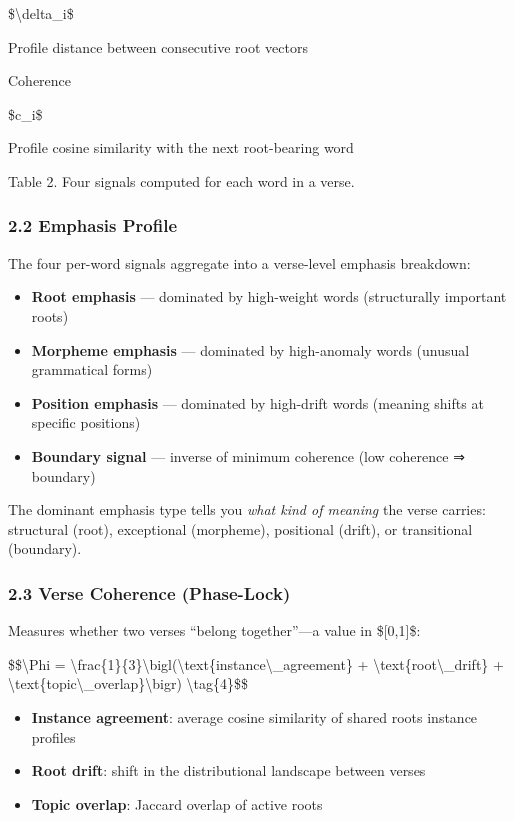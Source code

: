 \documentclass[12pt,a4paper]{article}
\providecommand{\tightlist}{\setlength{\itemsep}{0pt}\setlength{\parskip}{0pt}}
\begin{document}
\$\textbackslash delta\_i\$

Profile distance between consecutive root vectors

Coherence

\$c\_i\$

Profile cosine similarity with the next root-bearing word

Table 2. Four signals computed for each word in a verse.

\subsubsection{2.2 Emphasis Profile}\label{emphasis-profile}

The four per-word signals aggregate into a verse-level emphasis
breakdown:

\begin{itemize}
\tightlist
\item
  \textbf{Root emphasis} --- dominated by high-weight words
  (structurally important roots)
\item
  \textbf{Morpheme emphasis} --- dominated by high-anomaly words
  (unusual grammatical forms)
\item
  \textbf{Position emphasis} --- dominated by high-drift words (meaning
  shifts at specific positions)
\item
  \textbf{Boundary signal} --- inverse of minimum coherence (low
  coherence ⇒ boundary)
\end{itemize}

The dominant emphasis type tells you \emph{what kind of meaning} the
verse carries: structural (root), exceptional (morpheme), positional
(drift), or transitional (boundary).

\subsubsection{2.3 Verse Coherence
(Phase-Lock)}\label{verse-coherence-phase-lock}

Measures whether two verses ``belong together''---a value in
\${[}0,1{]}\$:

\$\$\textbackslash Phi =
\textbackslash frac\{1\}\{3\}\textbackslash bigl(\textbackslash text\{instance\textbackslash\_agreement\}
+ \textbackslash text\{root\textbackslash\_drift\} +
\textbackslash text\{topic\textbackslash\_overlap\}\textbackslash bigr)
\textbackslash tag\{4\}\$\$

\begin{itemize}
\tightlist
\item
  \textbf{Instance agreement}: average cosine similarity of shared
  roots\textquotesingle{} instance profiles
\item
  \textbf{Root drift}: shift in the distributional landscape between
  verses
\item
  \textbf{Topic overlap}: Jaccard overlap of active roots
\end{itemize}
\end{document}
